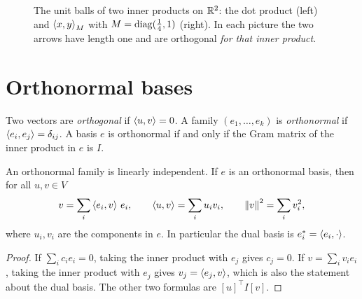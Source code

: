 \begin{notechapter}
\begin{figure}[ht]
\centering
{}
\caption{The unit balls of two inner products on $\mathbb{R}^2$: the dot product
(left) and $\left\langle x, y \right\rangle_M$ with $M = \operatorname{diag}(\frac14, 1)$ (right). In each
picture the two arrows have length one and are orthogonal \emph{for that
inner product}.}
\label{inner-products:fig:balls}
\end{figure}

\section{Orthonormal bases}\label{inner-products:sec:orthonormal}

\begin{definition}
Two vectors are \emph{orthogonal} if $\left\langle u, v \right\rangle = 0$. A family
$(e_1,\dots,e_k)$ is \emph{orthonormal} if
$\left\langle e_i, e_j \right\rangle = \delta_{ij}$. A basis $e$ is orthonormal if and only if
the Gram matrix of the inner product in $e$ is $I$.
\end{definition}

\begin{proposition}
\label{inner-products:prop:onb}
An orthonormal family is linearly independent. If $e$ is an orthonormal
basis, then for all $u, v\in V$
\[
  v = \sum_i\left\langle e_i, v \right\rangle\,e_i ,
  \qquad
  \left\langle u, v \right\rangle = \sum_iu_iv_i ,
  \qquad
  \left\|v\right\|^2 = \sum_iv_i^2 ,
\]
where $u_i, v_i$ are the components in $e$. In particular the dual basis is
$e_i^* = \left\langle e_i, \cdot \right\rangle$.
\end{proposition}

\begin{proof}
If $\sum_ic_ie_i = 0$, taking the inner product with $e_j$ gives $c_j = 0$.
If $v = \sum_iv_ie_i$, taking the inner product with $e_j$ gives
$v_j = \left\langle e_j, v \right\rangle$, which is also the statement about the dual basis.
The other two formulas are $[u]^\top I[v]$.
\end{proof}


\end{notechapter}
